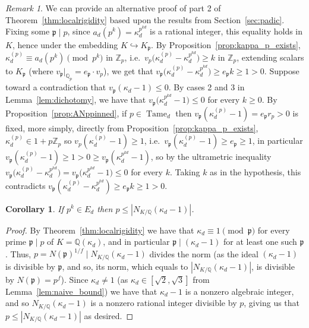 \documentclass{article}
\theoremstyle{plain}
\newtheorem{corollary}[theorem]{Corollary}
\theoremstyle{definition}
\theoremstyle{remark}
\newtheorem{remark}[theorem]{Remark}
\newcommand{\Q}{\mathbb{Q}}
\newcommand{\Zp}{\mathbb{Z}_p}
\newcommand{\Qp}{\mathbb{Q}_p}
\DeclareMathOperator{\Tame}{Tame}
\begin{document}
\begin{remark}
    We can provide an alternative proof of part 2 of Theorem~\ref{thm:localrigidity} based upon the results from Section~\ref{sec:padic}. Fixing some $\mathfrak p\mid p$, since $a_d(p^k)=\kappa_d^{p^{kd}}$ is a rational integer, this equality holds in $K$, hence under the embedding $K\hookrightarrow K_\mathfrak p$. By Proposition~\ref{prop:kappa_p_exists}, $\kappa_d^{(p)}\equiv a_d(p^k)\pmod{p^k}$ in $\Zp$, i.e.\ $v_p\big(\kappa_d^{(p)}-\kappa_d^{p^{kd}}\big)\ge k$ in $\Zp$, extending scalars to $K_\mathfrak p$ (where $v_\mathfrak p|_{\Qp}=e_\mathfrak p\cdot v_p$), we get that  $v_\mathfrak p\big(\kappa_d^{(p)}-\kappa_d^{p^{kd}}\big)\ge e_\mathfrak p k\ge1>0$. Suppose toward a contradiction that $v_\mathfrak p(\kappa_d-1)\le0$. By cases 2 and 3 in Lemma~\ref{lem:dichotomy}, we have that $v_\mathfrak p\big(\kappa_d^{p^{kd}}-1\big)\le0$ for every $k\ge0$. By Proposition~\ref{prop:ANppinned}, if $p\in\Tame_d$ then $v_\mathfrak p(\kappa_d^{(p)}-1)=e_\mathfrak p r_p>0$ is fixed, more simply, directly from Proposition~\ref{prop:kappa_p_exists}, $\kappa_d^{(p)}\in1+p\Zp$ so $v_p(\kappa_d^{(p)}-1)\ge1$, i.e.\ $v_\mathfrak p(\kappa_d^{(p)}-1)\ge e_\mathfrak p\ge1$, in particular $v_\mathfrak p(\kappa_d^{(p)}-1)\ge1>0\ge v_\mathfrak p(\kappa_d^{p^{kd}}-1)$, so by the ultrametric inequality $v_\mathfrak p\big(\kappa_d^{(p)}-\kappa_d^{p^{kd}}\big)=v_\mathfrak p\big(\kappa_d^{p^{kd}}-1\big)\le0$ for every $k$. Taking $k$ as in the hypothesis, this contradicts $v_\mathfrak p(\kappa_d^{(p)}-\kappa_d^{p^{kd}})\ge e_\mathfrak p k\ge1>0$.
\end{remark}

\begin{corollary}\label{cor:normbound}
    If $p^k \in E_d$ then $p\le|N_{K/\Q}(\kappa_d-1)|$.
\end{corollary}

\begin{proof}
    By Theorem~\ref{thm:localrigidity} we have that $\kappa_d\equiv1\pmod{\mathfrak p}$ for every prime $\mathfrak p\mid p$ of $K=\Q(\kappa_d)$, and in particular $\mathfrak p\mid(\kappa_d-1)$ for at least one such $\mathfrak p$. Thus, $p=N(\mathfrak p)^{1/f}\mid N_{K/\Q}(\kappa_d-1)$ divides the norm (as the ideal $(\kappa_d-1)$ is divisible by $\mathfrak p$, and so, its norm, which equals to $|N_{K/\Q}(\kappa_d-1)|$, is divisible by $N(\mathfrak p)=p^f$). Since $\kappa_d\ne1$ (as $\kappa_d\in[\sqrt2,\sqrt3]$ from Lemma~\ref{lem:naive_bound}) we have that $\kappa_d-1$ is a nonzero algebraic integer, and so $N_{K/\Q}(\kappa_d-1)$ is a nonzero rational integer divisible by $p$, giving us that $p\le|N_{K/\Q}(\kappa_d-1)|$ as desired.
\end{proof}
\end{document}
